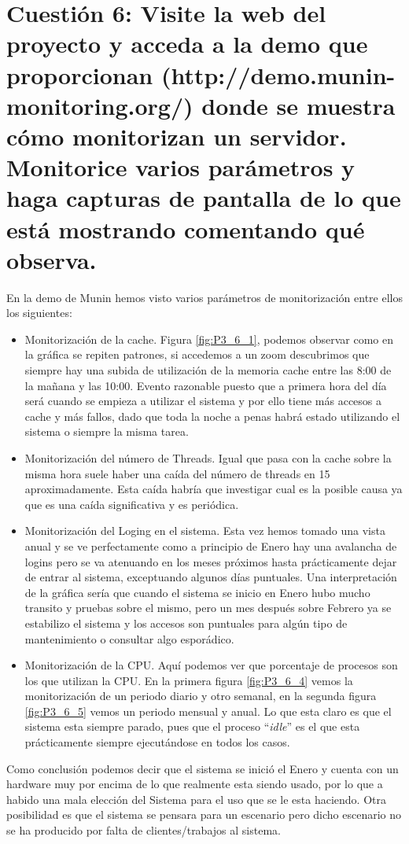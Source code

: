 \section{Cuestión 6: Visite la web del proyecto y acceda a la demo que proporcionan (http://demo.munin-monitoring.org/) donde se muestra cómo monitorizan un servidor. Monitorice varios parámetros y haga capturas de pantalla de lo que está mostrando comentando qué observa.}
En la demo de Munin hemos visto varios parámetros de monitorización entre ellos los siguientes:
\begin{itemize}
\item Monitorización de la cache. Figura \ref{fig:P3_6_1}, podemos observar como en la gráfica se 
repiten patrones, si accedemos a un zoom descubrimos que siempre hay una subida de utilización de la memoria
cache entre las 8:00 de la mañana y las 10:00. Evento razonable puesto que a primera hora del día será
cuando se empieza a utilizar el sistema y por ello tiene más accesos a cache y más fallos, dado que toda la 
noche a penas habrá estado utilizando el sistema o siempre la misma tarea.

\item Monitorización del número de Threads. Igual que pasa con la cache sobre la misma hora suele haber
una caída del número de threads en 15 aproximadamente. Esta caída habría que investigar cual es la posible
causa ya que es una caída significativa y es periódica.

\item Monitorización del Loging en el sistema. Esta vez hemos tomado una vista anual y se ve perfectamente
como a principio de Enero hay una avalancha de logins pero se va atenuando en los meses próximos hasta
prácticamente dejar de entrar al sistema, exceptuando algunos días puntuales. Una interpretación de la
gráfica sería que cuando el sistema se inicio en Enero hubo mucho transito y pruebas sobre el mismo, pero 
un mes después sobre Febrero ya se estabilizo el sistema y los accesos son puntuales para algún tipo de
mantenimiento o consultar algo esporádico.

\item Monitorización de la CPU. Aquí podemos ver que porcentaje de procesos son los que utilizan la 
CPU. En la primera figura \ref{fig:P3_6_4} vemos la monitorización de un periodo diario y otro semanal,
en la segunda figura \ref{fig:P3_6_5} vemos un periodo mensual y anual. Lo que esta claro es que el sistema
esta siempre parado, pues que el proceso ``\textit{idle}'' es el que esta prácticamente siempre ejecutándose
en todos los casos.\\
\end{itemize}
Como conclusión podemos decir que el sistema se inició el Enero y cuenta con un hardware muy por encima de lo
que realmente esta siendo usado, por lo que a habido una mala elección del Sistema para el uso que se 
le esta haciendo. Otra posibilidad es que el sistema se pensara para un escenario pero dicho escenario
 no se ha producido por falta de clientes/trabajos al sistema.

